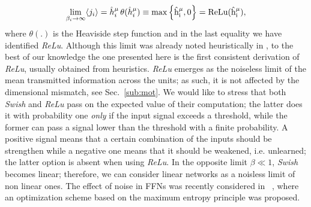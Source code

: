 \documentclass{article}
\begin{document}
%
\begin{equation} \label{eq:ps6}
\lim_{\beta_i \to \infty } \langle j_i \rangle =  \hat{h}^{\mu}_i \, \theta(\hat{h}^{\mu}_i)  \equiv   \rm{max} \left\{ \hat{h}^{\mu}_i, 0\right\} = ReLu(\hat{h}^{\mu}_i),
\end{equation}
%
where $\theta(.)$ is the Heaviside step function and in the last equality we have identified {\it ReLu}. Although this limit was already noted heuristically in \cite{prajit}, to the best of our knowledge the one presented here is the first consistent derivation of {\it ReLu}, usually obtained from heuristics. {\it ReLu} emerges as the noiseless limit of the mean transmitted information across the units; as such, it is not affected by the dimensional mismatch, see Sec.~\eqref{sub:mot}. We would like to stress that both {\it Swish} and {\it ReLu} pass on the expected value of their computation; the latter does it with probability one {\it only} if the input signal exceeds a threshold, while the former can pass a signal lower than the threshold with a finite probability. A positive signal means that a certain combination of the inputs should be strengthen while a negative one means that it should be weakened, i.e. unlearned; the latter option is absent when using {\it ReLu}. In the opposite limit $\beta \ll 1$, {\it Swish} becomes linear; therefore, we can consider linear networks as a noisless limit of non linear ones. The effect of noise in FFNs was recently considered in ~\cite{pratik}, where an optimization scheme based on the maximum entropy principle was proposed.
\end{document}
